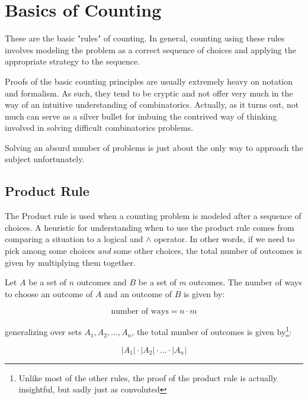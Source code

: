 \documentclass{standlone}
\begin{document}
\section{Basics of Counting}

These are the basic "rules" of counting. In general, counting using these rules
involves modeling the problem as a correct sequence of choices and applying the
appropriate strategy to the sequence.

Proofs of the basic counting principles are usually extremely heavy on notation
and formalism. As such, they tend to be cryptic and not offer very much in the
way of an intuitive understanding of combinatorics. Actually, as it turns out,
not much can serve as a silver bullet for imbuing the contrived way of thinking
involved in solving difficult combinatorics problems.

Solving an absurd number of problems is just about the only way to approach the
subject unfortunately.

\subsection{Product Rule}

The Product rule is used when a counting problem is modeled after a sequence of
choices. A heuristic for understanding when to use the product rule comes from
comparing a situation to a logical and $\land$ operator. In other words, if we
need to pick among some choices \emph{and} some other choices, the total number
of outcomes is given by multiplying them together.

\begin{theorem}
  Let $A$ be a set of $n$ outcomes and $B$ be a set of $m$ outcomes. The number
  of ways to choose an outcome of $A$ and an outcome of $B$ is given by:

  \begin{equation}
    \text{number of ways} = n \cdot m
  \end{equation}

  generalizing over sets $A_1, A_2, \dots, A_n$, the total number of outcomes
  is given by\footnote{Unlike most of the other rules, the proof of the product
  rule is actually insightful, but sadly just as convoluted}:

  \begin{equation}
    |A_1| \cdot |A_2| \cdot \dots \cdot |A_n|
  \end{equation}
\end{theorem}
\end{document}
